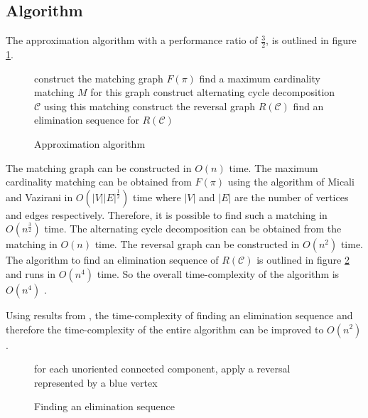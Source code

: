 \documentclass[11pt,DIV=11]{scrartcl}
\theoremstyle{definition}
\theoremstyle{remark}
\begin{document}
\subsection{Algorithm}
\label{sec:algorithm}

The approximation algorithm with a performance ratio of $\frac{3}{2}$, is outlined in figure \ref{alg:approximation}.

\begin{figure}[htb]
    \begin{algorithm}[H]
        construct the matching graph $F(\pi)$\;
        find a maximum cardinality matching $M$ for this graph\;
        construct alternating cycle decomposition $\mathcal{C}$ using this matching\;
        construct the reversal graph $R(\mathcal{C})$\;
        find an elimination sequence for $R(\mathcal{C})$\;
        \caption{Approximation algorithm \cite{Christie1998}}
    \end{algorithm}
    \caption{}
    \label{alg:approximation}
\end{figure}

The matching graph can be constructed in $O(n)$ time. The maximum cardinality matching can be obtained from $F(\pi)$ using the algorithm of Micali and Vazirani in $O(|V||E|^{\frac{1}{2}})$ time \cite{Micali1980} where $|V|$ and $|E|$ are the number of vertices and edges respectively. Therefore, it is possible to find such a matching in $O(n^{\frac{3}{2}})$ time. The alternating cycle decomposition can be obtained from the matching in $O(n)$ time. The reversal graph can be constructed in $O(n^2)$ time. The algorithm to find an elimination sequence of $R(\mathcal{C})$ is outlined in figure \ref{alg:elimination_sequence} and runs in $O(n^4)$ time. So the overall time-complexity of the algorithm is $O(n^4)$ \cite{Christie1998}.

Using results from \citeauthor*{Kaplan1997}, the time-complexity of finding an elimination sequence and therefore the time-complexity of the entire algorithm can be improved to $O(n^2)$ \cite{Kaplan1997}.

\begin{figure}[htb]
    \begin{algorithm}[H]
        for each unoriented connected component, apply a reversal represented by a blue vertex\;
        \caption{Finding an elimination sequence \cite{Christie1998}}
    \end{algorithm}
    \caption{}
    \label{alg:elimination_sequence}
\end{figure}
\end{document}
